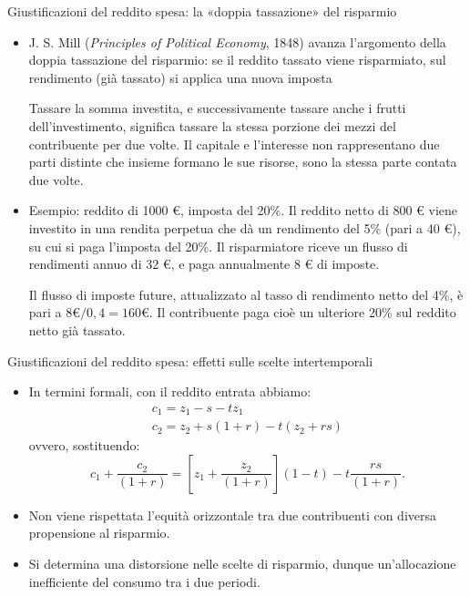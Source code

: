 \documentclass[aspectratio=64,12pt]{beamer}
\newcommand\€{\,\text{€}}
\begin{document}
\begin{frame}{Giustificazioni del reddito spesa: la «doppia tassazione» del risparmio}
\begin{itemize}
\item J. S. Mill (\emph{Principles of Political Economy}, 1848) avanza l'argomento della \alert{doppia tassazione del risparmio}: se il reddito tassato viene risparmiato, sul rendimento (già tassato) si applica una nuova imposta
\begin{quoting}\small
Tassare la somma investita, e successivamente tassare anche i frutti dell'investimento, significa tassare la stessa porzione dei mezzi del contribuente per due volte. Il capitale e l'interesse non rappresentano due parti distinte che insieme formano le sue risorse, sono la stessa parte contata due volte.
\end{quoting}
\item Esempio: reddito di 1000 €, imposta del 20\%. Il reddito netto di 800 € viene
investito in una rendita perpetua che dà un rendimento del 5\% (pari a 40 €),
su cui si paga l'imposta del 20\%.  Il risparmiatore riceve un flusso di
rendimenti annuo di 32 €, e paga annualmente 8 € di imposte.

Il flusso di imposte future, attualizzato al tasso di rendimento netto del
4\%, è pari a $8€/0,4=160 €$. Il contribuente paga cioè un ulteriore 20\% sul reddito
netto già tassato.
\end{itemize}
\end{frame}

\begin{frame}{Giustificazioni del reddito spesa: effetti sulle scelte intertemporali}

\begin{itemize}
\item In termini formali, con il reddito entrata abbiamo:  
\begin{gather*}
  c_1=z_1-s-tz_1\\
  c_2=z_2+s(1+r) -t(z_2 +rs)
\end{gather*}
ovvero, sostituendo:
\begin{equation*}
c_1+\frac{c_2}{(1+r)}=
\left[z_1+\frac{z_2}{(1+r)}\right](1-t)-t\frac{rs}{(1+r)}.
\end{equation*}
\item Non viene rispettata l'equità orizzontale tra due contribuenti con diversa
propensione al risparmio.
\item Si determina una distorsione nelle scelte di risparmio, dunque un'allocazione inefficiente del consumo tra i due periodi.
\end{itemize}
\end{frame}
\end{document}
